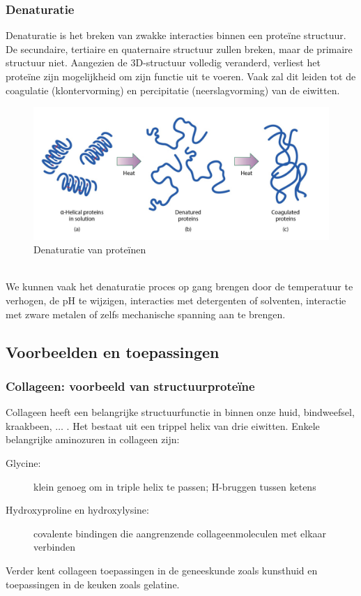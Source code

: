 \documentclass[a4paper,kul]{kulakarticle} %
\begin{document}
\subsubsection{Denaturatie} 
Denaturatie is het breken van zwakke interacties binnen een proteïne structuur. De secundaire, tertiaire en quaternaire structuur zullen breken, maar de primaire structuur niet. Aangezien de 3D-structuur volledig veranderd, verliest het proteïne zijn mogelijkheid om zijn functie uit te voeren. Vaak zal dit leiden tot de coagulatie (klontervorming) en percipitatie (neerslagvorming) van de eiwitten.
\begin{figure}[h]
	\centering
	\includegraphics[width=0.7\linewidth]{Denaturatie}
	\caption[Denaturatie]{Denaturatie van proteïnen}
	\label{fig:denaturatie}
\end{figure}\\
We kunnen vaak het denaturatie proces op gang brengen door de temperatuur te verhogen, de pH te wijzigen, interacties met detergenten of solventen, interactie met zware metalen of zelfs mechanische spanning aan te brengen. 
\newpage
\subsection{Voorbeelden en toepassingen}
\subsubsection{Collageen: voorbeeld van structuurproteïne}
Collageen heeft een belangrijke structuurfunctie in binnen onze huid, bindweefsel, kraakbeen, $\ldots$ . Het bestaat uit een trippel helix van drie eiwitten. Enkele belangrijke aminozuren in collageen zijn:
\begin{description}
	\item[Glycine:] klein genoeg om in triple helix te
	passen; H-bruggen tussen ketens
	\item[Hydroxyproline en hydroxylysine:] covalente bindingen die aangrenzende
	collageenmoleculen met elkaar verbinden
\end{description}
Verder kent collageen toepassingen in de geneeskunde zoals kunsthuid en toepassingen in de keuken zoals gelatine. 
\end{document}
